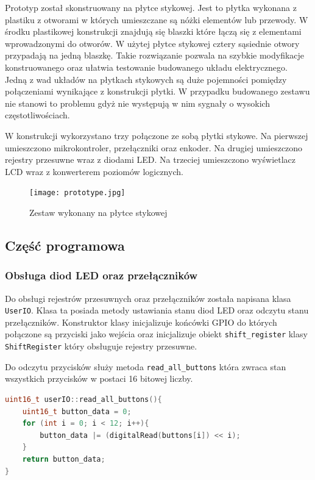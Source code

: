 \documentclass[../main.tex]{subfiles}
\begin{document}
Prototyp został skonstruowany na płytce stykowej. Jest to płytka wykonana z plastiku z otworami w których umieszczane są nóżki elementów lub przewody.
W środku plastikowej konstrukcji znajdują się blaszki które łączą się z elementami wprowadzonymi do otworów. W użytej płytce stykowej cztery sąsiednie
otwory przypadają na jedną blaszkę. Takie rozwiązanie pozwala na szybkie modyfikacje konstruowanego oraz ułatwia testowanie
budowanego układu elektrycznego. Jedną z wad układów na płytkach stykowych są duże pojemności pomiędzy połączeniami wynikające
z konstrukcji płytki. W przypadku budowanego zestawu nie stanowi to problemu gdyż nie występują w nim sygnały o wysokich częstotliwościach.

W konstrukcji wykorzystano trzy połączone ze sobą płytki stykowe. Na pierwszej umieszczono mikrokontroler, przełączniki oraz enkoder.
Na drugiej umieszczono rejestry przesuwne wraz z diodami LED. Na trzeciej umieszczono wyświetlacz LCD wraz z konwerterem poziomów logicznych.

\begin{figure}[H]
    \centering
    \texttt{[image: prototype.jpg]}
    \caption{Zestaw wykonany na płytce stykowej}    
    \label{fig:prototype}
\end{figure}


\subsection{Część programowa}

\subsubsection{Obsługa diod LED oraz przełączników}

Do obsługi rejestrów przesuwnych oraz przełączników została napisana klasa \texttt{UserIO}. Klasa ta posiada metody ustawiania stanu
diod LED oraz odczytu stanu przełączników. Konstruktor klasy inicjalizuje końcówki GPIO do których połączone są przyciski jako wejścia oraz
inicjalizuje obiekt \texttt{shift\_register} klasy \texttt{ShiftRegister} który obsługuje rejestry przesuwne. 
\par
Do odczytu przycisków służy metoda \texttt{read\_all\_buttons} która zwraca stan wszystkich przycisków w postaci 16 bitowej liczby.

\begin{lstlisting}[language=C++]
    uint16_t userIO::read_all_buttons(){
    uint16_t button_data = 0;
    for (int i = 0; i < 12; i++){
        button_data |= (digitalRead(buttons[i]) << i);
    }
    return button_data;
}
\end{lstlisting}
\end{document}
